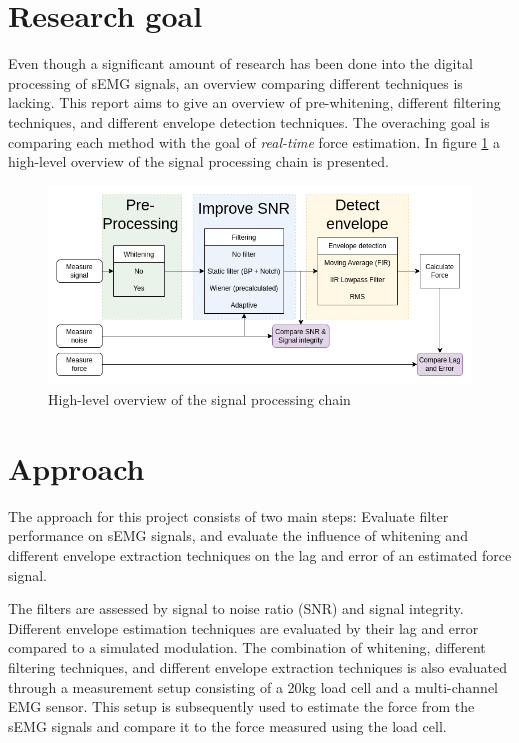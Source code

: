 \section{Research goal}
Even though a significant amount of research has been done into the digital processing of sEMG signals, an overview comparing different techniques is lacking. This report aims to give an overview of pre-whitening, different filtering techniques, and different envelope detection techniques. The overaching goal is comparing each method with the goal of \textit{real-time} force estimation. 
In figure \ref{fig:global_thesis_flowchart} a high-level overview of the signal processing chain is presented. 

\begin{figure}[h!t]
	\begin{center}
		\includegraphics[width=1.0\columnwidth]{images/global_thesis_flowchart.png}
	\end{center}
	\caption{High-level overview of the signal processing chain}
	\label{fig:global_thesis_flowchart}
\end{figure}


\section{Approach}
The approach for this project consists of two main steps: Evaluate filter performance on sEMG signals, and evaluate the influence of whitening and different envelope extraction techniques on the lag and error of an estimated force signal.

The filters are assessed by signal to noise ratio (SNR) and signal integrity. Different envelope estimation techniques are evaluated by their lag and error compared to a simulated modulation. The combination of whitening, different filtering techniques, and different envelope extraction techniques is also evaluated through a measurement setup consisting of a 20kg load cell and a multi-channel EMG sensor. This setup is subsequently used to estimate the force from the sEMG signals and compare it to the force measured using the load cell.